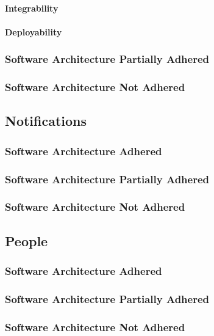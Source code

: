 \documentclass{article}
\begin{document}
            \paragraph{Integrability}
            \paragraph{Deployability}
        \subsubsection{Software Architecture Partially Adhered}
        \subsubsection{Software Architecture Not Adhered}       
        
    \subsection{Notifications}
        \subsubsection{Software Architecture Adhered}
        \subsubsection{Software Architecture Partially Adhered}
        \subsubsection{Software Architecture Not Adhered}       
        
    \subsection{People}
        \subsubsection{Software Architecture Adhered}
        \subsubsection{Software Architecture Partially Adhered}
        \subsubsection{Software Architecture Not Adhered}       
        
\end{document}
